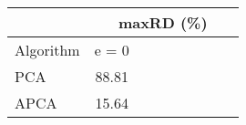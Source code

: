 \begin{table}[h]
\newcommand{\cpca}{\cellcolor{cyan!20}}
\newcommand{\capca}{\cellcolor{green!20}}
\newcommand{\cfr}{\cellcolor{yellow!25}}
\newcommand{\cgzip}{\cellcolor{orange!20}}
\newcommand{\cca}{\cellcolor{violet!20}}
\newcommand{\best}{\cellcolor{gray!30}}
\centering\hspace*{0cm}\begin{tabular}{| l | c | c | c | c | c | c | c | c |}\cline{2-9}\multicolumn{1}{c|}{}& \multicolumn{8}{c|}{maxRD (\%)}\\\hline
{Algorithm} & {e = 0} \\\hline
{PCA\cpca} & {88.81} \\\hline
{APCA\capca} & {\best15.64} \\\hline
\end{tabular}
\caption{\captionminmaxone}
\label{experiments:minmaxone}
\end{table}
